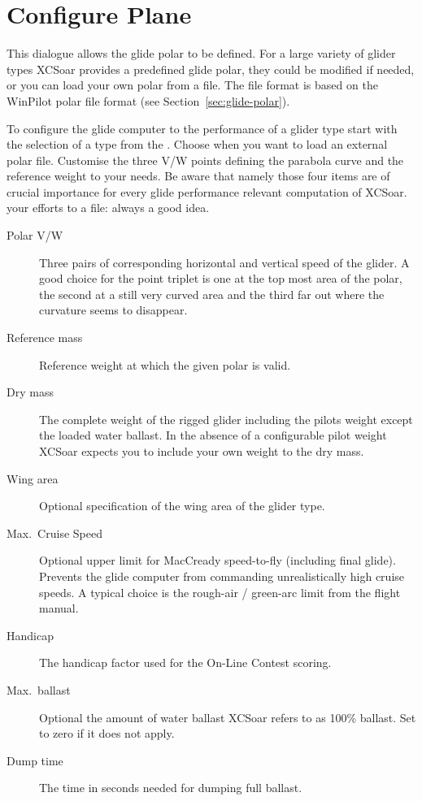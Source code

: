 \section{Configure Plane}

This dialogue allows the glide polar to be defined. For a large variety of glider
types XCSoar provides a predefined glide polar, they could be modified if 
needed, or you can load your own polar from a file. 
The file format is based on the WinPilot polar file format (see Section~\ref{sec:glide-polar}).

\label{conf:polar} To configure the glide computer to the performance of a glider 
type start with the selection of a type from the . 
Choose  when you want to load an external polar file.
Customise the three V/W points defining the parabola curve and the reference
weight to your needs. 
\tip Be aware that namely those four items are of crucial importance 
for every glide performance relevant computation of XCSoar.   
 your efforts to a file: always a good idea.

\begin{description}
\item[Polar V/W]  Three pairs of corresponding horizontal and vertical speed of the glider. 
  A good choice for the point triplet is one at the top most area of the polar, the second at a 
  still very curved area and the third far out where the curvature seems to disappear.
\item[Reference mass]  Reference weight at which the given polar is valid.
\item[Dry mass]  The complete weight of the rigged glider including the pilots weight except the 
  loaded water ballast. 
  In the absence of a configurable pilot weight XCSoar expects you to include your own weight
  to the dry mass.
\item[Wing area]  Optional specification of the wing area of the glider type.
\item[Max.\ Cruise Speed] Optional upper limit for MacCready speed-to-fly
  (including final glide).  Prevents the glide computer from commanding
  unrealistically high cruise speeds.  A typical choice is the rough-air
  / green-arc limit from the flight manual.
\item[Handicap]  The handicap factor used for the On-Line Contest scoring.
\item[Max.\ ballast]  Optional the amount of water ballast XCSoar refers to as 100\% ballast.
  Set to zero if it does not apply.
\item[Dump time]  The time in seconds needed for dumping full ballast.
\end{description}


